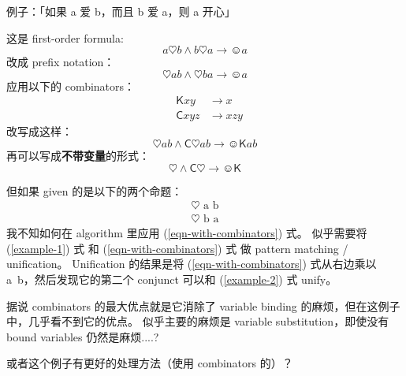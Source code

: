 \documentclass[12pt, orivec]{article}
\begin{document}
\setlength{\parindent}{0pt}
\setlength{\parskip}{2.8ex plus0.8ex minus0.8ex}

例子：「如果 a 爱 b，而且 b 爱 a，则 a 开心」

这是 first-order formula:
\begin{equation}
a \heartsuit b \wedge b \heartsuit a \rightarrow \smiley a	
\end{equation}
改成 prefix notation：
\begin{equation}
\heartsuit a b \wedge \heartsuit b a \rightarrow \smiley a	
\end{equation}
应用以下的 combinators：
\begin{eqnarray}
& \mathsf{K} x y & \rightarrow x \\
& \mathsf{C} x y z & \rightarrow x z y
\end{eqnarray}
改写成这样：
\begin{equation}
\heartsuit a b \wedge \mathsf{C} \heartsuit a b \rightarrow \smiley \mathsf{K} a b
\end{equation}
再可以写成\textbf{不带变量}的形式：
\begin{equation}
\label{eqn-with-combinators}
\heartsuit \wedge \mathsf{C} \heartsuit \rightarrow \smiley \mathsf{K}
\end{equation}

但如果 given 的是以下的两个命题：
\begin{eqnarray}
\heartsuit \mbox{ a b} \label{example-1} \\
\heartsuit \mbox{ b a} \label{example-2}
\end{eqnarray}
我不知如何在 algorithm 里应用 (\ref{eqn-with-combinators}) 式。 似乎需要将 (\ref{example-1}) 式 和 (\ref{eqn-with-combinators}) 式 做 pattern matching / unification。  Unification 的结果是将 (\ref{eqn-with-combinators}) 式从右边乘以 \mbox{a b}，然后发现它的第二个 conjunct 可以和 (\ref{example-2}) 式  unify。 

据说 combinators 的最大优点就是它消除了 variable binding 的麻烦，但在这例子中，几乎看不到它的优点。  似乎主要的麻烦是 variable substitution，即使没有 bound variables 仍然是麻烦....?

或者这个例子有更好的处理方法（使用 combinators 的）？
\end{document}

